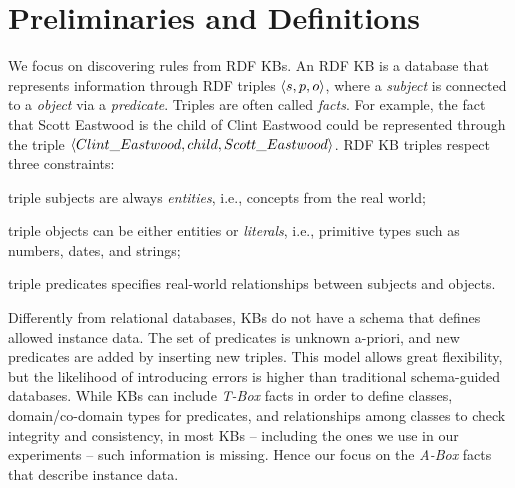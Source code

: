 \section{Preliminaries and Definitions} \label{sec:krd_prel}
We focus on discovering rules from RDF KBs. An RDF KB is
a database that represents information through RDF triples $\langle s,p,o\rangle$, where a \emph{subject} is connected to a \emph{object} via a \emph{predicate}. Triples are often called \emph{facts}. For example, the fact that Scott Eastwood is the child of Clint Eastwood could be represented through the triple $\langle Clint\_Eastwood,child,Scott\_Eastwood\rangle$. 
RDF KB triples respect three constraints:
\begin{inparaenum}[(i)]
	\item triple subjects are always \emph{entities}, i.e., concepts from the real world;
	\item triple objects can be either entities or \emph{literals}, i.e.,  primitive types such as numbers, dates, and strings;
	\item triple predicates specifies real-world relationships between subjects and objects.
\end{inparaenum}

Differently from relational databases, KBs do not have a schema that defines allowed instance data. 
The set of predicates is unknown a-priori, and new predicates are added by inserting new triples. %
This model allows great flexibility, but the likelihood of introducing errors is higher than traditional schema-guided databases.
While KBs can include \emph{T-Box} facts in order to define classes, domain/co-domain types for predicates, and relationships among classes
to check integrity and consistency, in most KBs -- including the ones we use in our experiments -- such information is missing. %
Hence our focus on the \emph{A-Box} facts that describe instance data. 

